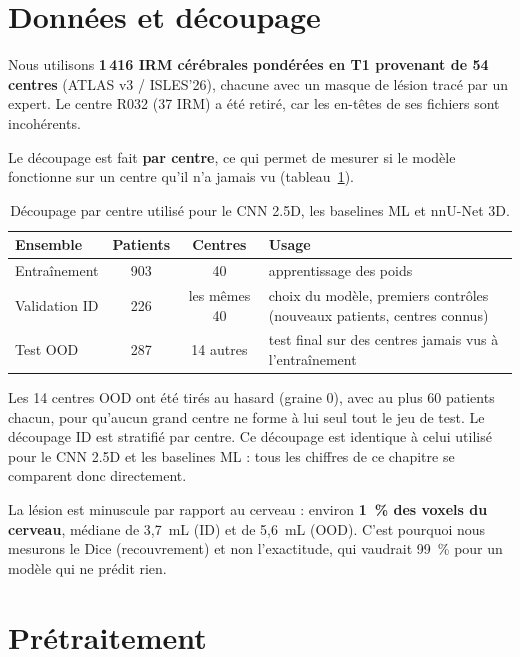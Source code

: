 \section{Données et découpage}
\label{sec:anas-donnees}

Nous utilisons \textbf{1\,416 IRM cérébrales pondérées en T1 provenant de 54 centres} (ATLAS v3 / ISLES'26), chacune avec un masque de lésion tracé par un expert.
Le centre R032 (37 IRM) a été retiré, car les en-têtes de ses fichiers sont incohérents.

Le découpage est fait \textbf{par centre}, ce qui permet de mesurer si le modèle fonctionne sur un centre qu'il n'a jamais vu (tableau~\ref{tab:anas-decoupage}).

\begin{table}[htbp]
  \centering
  \caption{Découpage par centre utilisé pour le CNN 2.5D, les baselines ML et nnU-Net 3D.}
  \label{tab:anas-decoupage}
  \small
  \begin{tabular}{lccl}
    \toprule
    Ensemble & Patients & Centres & Usage \\
    \midrule
    Entraînement & 903 & 40 & apprentissage des poids \\
    Validation ID & 226 & les mêmes 40 & \makecell[l]{choix du modèle, premiers contrôles\\(nouveaux patients, centres connus)} \\
    Test OOD & 287 & 14 autres & test final sur des centres jamais vus à l'entraînement \\
    \bottomrule
  \end{tabular}
\end{table}

Les 14 centres OOD ont été tirés au hasard (graine 0), avec au plus 60 patients chacun, pour qu'aucun grand centre ne forme à lui seul tout le jeu de test.
Le découpage ID est stratifié par centre.
Ce découpage est identique à celui utilisé pour le CNN 2.5D et les baselines ML : tous les chiffres de ce chapitre se comparent donc directement.

La lésion est minuscule par rapport au cerveau : environ \textbf{1~\% des voxels du cerveau}, médiane de 3,7~mL (ID) et de 5,6~mL (OOD).
C'est pourquoi nous mesurons le Dice (recouvrement) et non l'exactitude, qui vaudrait 99~\% pour un modèle qui ne prédit rien.

\section{Prétraitement}
\label{sec:anas-pretraitement}

